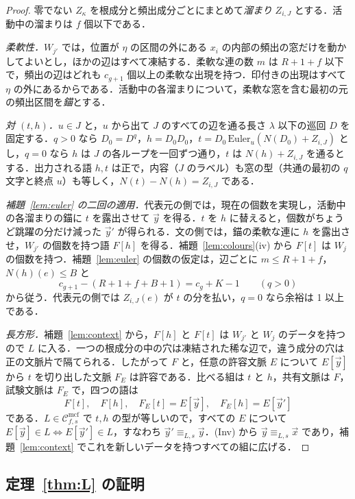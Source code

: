 \documentclass[11pt,a4paper]{ltjsarticle}
\numberwithin{equation}{section}
\theoremstyle{plain}
\theoremstyle{definition}
\theoremstyle{remark}
\theoremstyle{plain}
\newcommand{\Cmcf}[2]{\mathcal{C}^{\mathrm{mcf}}_{#1,#2}}
\newcommand{\tuple}[1]{\vec{#1}}
\begin{document}
\begin{proof}
零でない $Z_\kappa$ を根成分と頻出成分ごとにまとめて\emph{溜まり} $Z_{i,J}$ とする．活動中の溜まりは $f$ 個以下である．

\emph{柔軟性．}$W_{j'}$ では，位置が $\eta$ の区間の外にある $x_i$ の内部の頻出の窓だけを動かしてよいとし，ほかの辺はすべて凍結する．柔軟な連の数 $m$ は $R+1+f$ 以下で，頻出の辺はどれも $c_{g+1}$ 個以上の柔軟な出現を持つ．印付きの出現はすべて $\eta$ の外にあるからである．活動中の各溜まりについて，柔軟な窓を含む最初の元の頻出区間を\emph{錨}とする．

\emph{対 $(t,h)$．}$u\in J$ と，$u$ から出て $J$ のすべての辺を通る長さ $\lambda$ 以下の巡回 $D$ を固定する．$q>0$ なら $D_0=D^q$，$h=D_0D_0$，$t=D_0\,\mathrm{Euler}_u(N(D_0)+Z_{i,J})$ とし，$q=0$ なら $h$ は $J$ の各ループを一回ずつ通り，$t$ は $N(h)+Z_{i,J}$ を通るとする．出力される語 $h,t$ は正で，内容（$J$ のラベル）も窓の型（共通の最初の $q$ 文字と終点 $u$）も等しく，$N(t)-N(h)=Z_{i,J}$ である．

\emph{補題~\ref{lem:euler} の二回の適用．}代表元の側では，現在の個数を実現し，活動中の各溜まりの錨に $t$ を露出させて $\tuple y$ を得る．$t$ を $h$ に替えると，個数がちょうど跳躍の分だけ減った $\tuple y'$ が得られる．文の側では，錨の柔軟な連に $h$ を露出させ，$W_{j'}$ の個数を持つ語 $F[h]$ を得る．補題~\ref{lem:colours}(iv) から $F[t]$ は $W_j$ の個数を持つ．補題~\ref{lem:euler} の個数の仮定は，辺ごとに $m\le R+1+f$，$N(h)(e)\le B$ と
\[
 c_{g+1}-(R+1+f+B+1)=c_g+K-1\qquad(q>0)
\]
から従う．代表元の側では $Z_{i,J}(e)$ が $t$ の分を払い，$q=0$ なら余裕は 1 以上である．

\emph{長方形．}補題~\ref{lem:context} から，$F[h]$ と $F[t]$ は $W_{j'}$ と $W_j$ のデータを持つので $L$ に入る．一つの根成分の中の穴は凍結された稀な辺で，違う成分の穴は正の文脈片で隔てられる．したがって $F$ と，任意の許容文脈 $E$ について $E[\tuple y]$ から $t$ を切り出した文脈 $F_E$ は許容である．比べる組は $t$ と $h$，共有文脈は $F$，試験文脈は $F_E$ で，四つの語は
\[
F[t],\quad F[h],\quad F_E[t]=E[\tuple y],\quad F_E[h]=E[\tuple y']
\]
である．$L\in\Cmcf{f}{s}$ で $t,h$ の型が等しいので，すべての $E$ について $E[\tuple y]\in L\iff E[\tuple y']\in L$，すなわち $\tuple y'\equiv_{L,s}\tuple y$．(Inv) から $\tuple y\equiv_{L,s}\tuple x$ であり，補題~\ref{lem:context} でこれを新しいデータを持つすべての組に広げる．
\end{proof}

\subsection{定理~\ref{thm:L} の証明}
\end{document}

